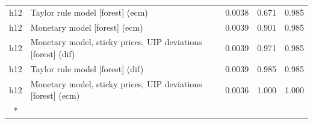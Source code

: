 \begin{ThreePartTable}
\begin{longtable}[t]{cp{5.5cm}ccc}
h12 & \raggedright Taylor rule model [forest] (ecm) & 0.0038 & 0.671 & 0.985\\
h12 & \raggedright Monetary model [forest] (ecm) & 0.0039 & 0.901 & 0.985\\
h12 & \raggedright Monetary model, sticky prices, UIP deviations [forest] (dif) & 0.0039 & 0.971 & 0.985\\
h12 & \raggedright Taylor rule model [forest] (dif) & 0.0039 & 0.985 & 0.985\\
h12 & \raggedright Monetary model, sticky prices, UIP deviations [forest] (ecm) & 0.0036 & 1.000 & 1.000\\*
\end{longtable}
\end{ThreePartTable}
\endgroup{}
